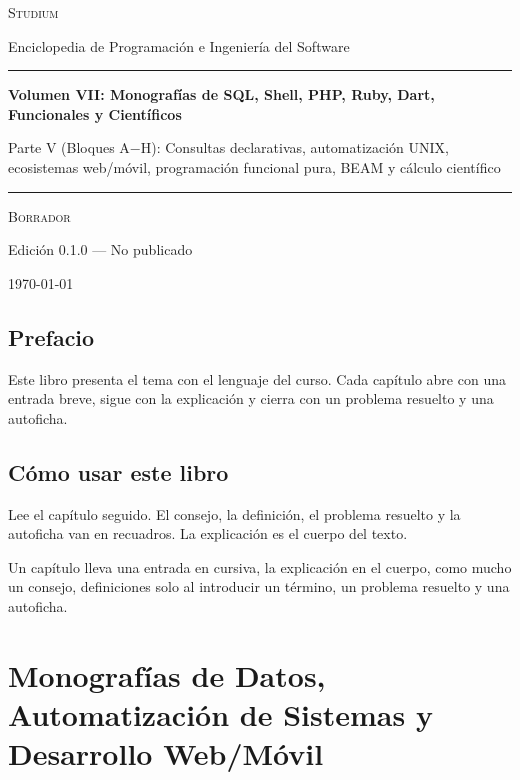 \documentclass{book}
\begin{document}
\frontmatter
\thispagestyle{empty}
\setlength{\parindent}{0pt}
\vspace*{0.08\textheight}
{\normalsize\scshape\color{studiumInk} Studium\par}
{\small Enciclopedia de Programación e Ingeniería del Software\par}
\vspace{0.55em}
{\color{studiumRule}\rule{\linewidth}{0.9pt}\par}
\vspace{0.16\textheight}
{\raggedright\Huge\bfseries Volumen VII: Monografías de SQL, Shell, PHP, Ruby, Dart, Funcionales y Científicos\par}
\vspace{0.9em}
{\raggedright\Large\color{studiumInk} Parte V (Bloques A\(-\)H): Consultas declarativas, automatización UNIX, ecosistemas web/móvil, programación funcional pura, BEAM y cálculo científico\par}
\vfill
{\color{studiumRule}\rule{0.36\linewidth}{0.45pt}\par}
\vspace{1.05em}
{\large\scshape Borrador\par}
\vspace{0.45em}
{\normalsize Edición 0.1.0 --- No publicado\par}
\vspace{0.4em}
{\normalsize\today\par}
\vspace*{0.08\textheight}
\clearpage
\chapter{Prefacio}
\noindent Este libro presenta el tema con el lenguaje del curso. Cada capítulo abre con una entrada breve, sigue con la explicación y cierra con un problema resuelto y una autoficha.
\chapter{Cómo usar este libro}
\noindent Lee el capítulo seguido. El consejo, la definición, el problema resuelto y la autoficha van en recuadros. La explicación es el cuerpo del texto.

\noindent Un capítulo lleva una entrada en cursiva, la explicación en el cuerpo, como mucho un consejo, definiciones solo al introducir un término, un problema resuelto y una autoficha.
\tableofcontents
\mainmatter

\part{Monografías de Datos, Automatización de Sistemas y Desarrollo Web/Móvil}
\end{document}
